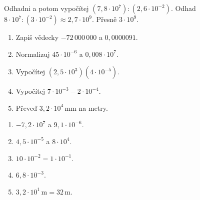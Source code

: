\documentclass[11pt,a4paper]{article}
\begin{document}
\begin{prikladReseniBox}[title={Rozšíření procvičení},breakable=false]
Odhadni a potom vypočítej $(7{,}8\cdot10^7):(2{,}6\cdot10^{-2})$.
\tcblower
Odhad $8\cdot10^7:(3\cdot10^{-2})\approx2{,}7\cdot10^9$. Přesně $3\cdot10^9$.
\end{prikladReseniBox}





\begin{zadaniReseniBox}[title={Domácí úlohy},breakable=false]
\begin{enumerate}[label=\alph*)]
\item Zapiš vědecky $-72\,000\,000$ a $0{,}0000091$.
\item Normalizuj $45\cdot10^{-6}$ a $0{,}008\cdot10^7$.
\item Vypočítej $(2{,}5\cdot10^3)(4\cdot10^{-5})$.
\item Vypočítej $7\cdot10^{-3}-2\cdot10^{-4}$.
\item Převeď $3{,}2\cdot10^4\,\mathrm{mm}$ na metry.
\end{enumerate}
\tcblower
\begin{enumerate}[label=\alph*)]
\item $-7{,}2\cdot10^7$ a $9{,}1\cdot10^{-6}$.
\item $4{,}5\cdot10^{-5}$ a $8\cdot10^4$.
\item $10\cdot10^{-2}=1\cdot10^{-1}$.
\item $6{,}8\cdot10^{-3}$.
\item $3{,}2\cdot10^1\,\mathrm m=32\,\mathrm m$.
\end{enumerate}
\end{zadaniReseniBox}
\end{document}
